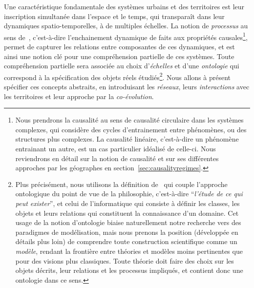 {Une caractéristique fondamentale des systèmes urbains et des territoires est leur inscription simultanée dans l'espace et le temps, qui transparaît dans leur dynamiques spatio-temporelles, à de multiples échelles. La notion de \emph{processus} au sens de~\cite{hypergeo}, c'est-à-dire l'enchainement dynamique de faits aux propriétés causales\footnote{Nous prendrons la causalité au sens de causalité circulaire dans les systèmes complexes, qui considère des cycles d'entrainement entre phénomènes, ou des structures plus complexes. La causalité linéaire, c'est-à-dire un phénomène entrainant un autre, est un cas particulier idéalisé de celle-ci. Nous reviendrons en détail sur la notion de causalité et sur ses différentes approches par les géographes en section~\ref{sec:causalityregimes}.}, permet de capturer les relations entre composantes de ces dynamiques, et est ainsi une notion clé pour une compréhension partielle de ces systèmes. Toute compréhension partielle sera associée au choix d'\emph{échelles} et d'une \emph{ontologie} qui correspond à la spécification des objets réels étudiés\footnote{Plus précisément, nous utilisons la définition de~\cite{livet2010} qui couple l'approche ontologique du point de vue de la philosophie, c'est-à-dire ``\textit{l'étude de ce qui peut exister}'', et celui de l'informatique qui consiste à définir les classes, les objets et leurs relations qui constituent la connaissance d'un domaine. Cet usage de la notion d'ontologie biaise naturellement notre recherche vers des paradigmes de modélisation, mais nous prenons la position (développée en détails plus loin) de comprendre toute construction scientifique comme un \emph{modèle}, rendant la frontière entre théories et modèles moins pertinentes que pour des visions plus classiques. Toute théorie doit faire des choix sur les objets décrits, leur relations et les processus impliqués, et contient donc une ontologie dans ce sens.}. Nous allons à présent spécifier ces concepts abstraits, en introduisant les \emph{réseaux}, leurs \emph{interactions} avec les territoires et leur approche par la \emph{co-évolution}.
}

